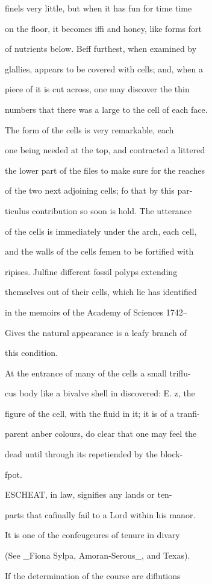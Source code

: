 \documentclass{article}
\begin{document}
finels very little, but when it has fun for time time

on the floor, it becomes iffi and honey, like forms fort

of nutrients below. Beff furthest, when examined by

glallies, appears to be covered with cells; and, when a

piece of it is cut across, one may discover the thin

numbers that there was a large to the cell of each face.

The form of the cells is very remarkable, each

one being needed at the top, and contracted a littered

the lower part of the files to make sure for the reaches

of the two next adjoining cells; fo that by this par-

ticulus contribution so soon is hold. The utterance

of the cells is immediately under the arch, each cell,

and the walls of the cells femen to be fortified with

ripises. Julfine different fossil polyps extending

themselves out of their cells, which lie has identified

in the memoirs of the Academy of Sciences 1742--

Gives the natural appearance is a leafy branch of

this condition.

At the entrance of many of the cells a small triflu-

cus body like a bivalve shell in discovered: E. z, the

figure of the cell, with the fluid in it; it is of a tranfi-

parent anber colours, do clear that one may feel the

dead until through its repetiended by the block-

fpot.

ESCHEAT, in law, signifies any lands or ten-

parts that cafinally fail to a Lord within his manor.

It is one of the confeugeures of tenure in divary

(See \_Fiona Sylpa, Amoran-Serous\_, and Texas).

If the determination of the course are diflutions
\end{document}

